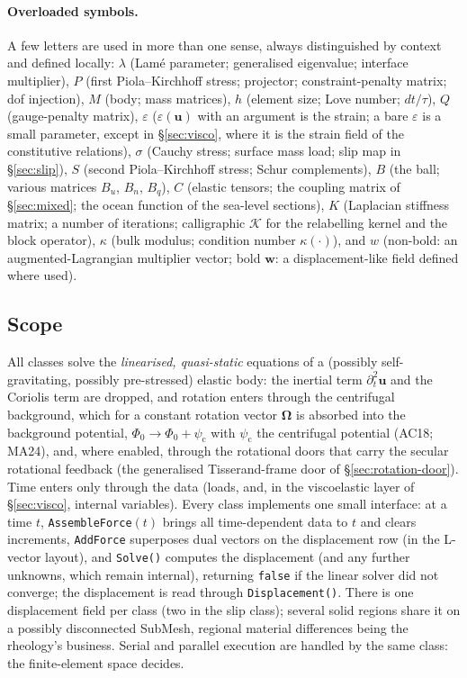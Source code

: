 \documentclass[11pt]{article}
\numberwithin{equation}{section}
\theoremstyle{remark}
\newcommand{\eps}{\varepsilon}
\newcommand{\vu}{\mathbf{u}}
\newcommand{\vw}{\mathbf{w}}
\newcommand{\code}[1]{\texttt{#1}}
\begin{document}
\paragraph{Overloaded symbols.} A few letters are used in more than one
sense, always distinguished by context and defined locally: $\lambda$
(Lam\'e parameter; generalised eigenvalue; interface multiplier), $P$
(first Piola--Kirchhoff stress; projector; constraint-penalty matrix;
dof injection), $M$ (body; mass matrices), $h$ (element size; Love number;
$dt/\tau$), $Q$ (gauge-penalty matrix), $\eps$ ($\eps(\vu)$ with an
argument is the strain; a bare $\eps$ is a small parameter, except in
\S\ref{sec:visco}, where it is the strain field of the constitutive
relations), $\sigma$ (Cauchy
stress; surface mass load; slip map in \S\ref{sec:slip}), $S$ (second
Piola--Kirchhoff stress; Schur complements), $B$ (the ball; various
matrices $B_u$, $B_n$, $B_q$), $C$ (elastic tensors; the coupling matrix of
\S\ref{sec:mixed}; the ocean function of the sea-level sections), $K$
(Laplacian stiffness matrix; a number of
iterations; calligraphic $\mathcal{K}$ for the relabelling kernel and the
block operator), $\kappa$ (bulk modulus; condition number $\kappa(\cdot)$),
and $w$
(non-bold: an augmented-Lagrangian multiplier vector; bold $\vw$: a
displacement-like field defined where used).

\subsection{Scope}

All classes solve the \emph{linearised, quasi-static} equations of a
(possibly self-gravitating, possibly pre-stressed) elastic body: the
inertial term $\partial_t^2\vu$ and the Coriolis term are dropped, and
rotation enters through the centrifugal background, which for a
constant rotation vector $\bm{\Omega}$ is absorbed into the background
potential, $\Phi_0 \to \Phi_0 + \psi_{\mathrm{c}}$ with
$\psi_{\mathrm{c}}$ the centrifugal potential (AC18; MA24), and, where
enabled, through the rotational doors that carry the secular rotational
feedback (the generalised Tisserand-frame door of
\S\ref{sec:rotation-door}). Time enters only through the data (loads,
and, in the viscoelastic layer of \S\ref{sec:visco}, internal variables).
Every class implements one small interface: at a time $t$,
\code{AssembleForce}$(t)$ brings all time-dependent data to $t$ and
clears increments, \code{AddForce} superposes dual vectors on the
displacement row (in the L-vector layout), and \code{Solve()} computes the
displacement (and any further unknowns, which remain internal), returning
\code{false} if the linear solver did not converge; the displacement is
read through \code{Displacement()}. There is one displacement field
per class (two in the slip class); several solid regions share it on a
possibly disconnected SubMesh, regional material differences being the
rheology's business. Serial and parallel execution are handled by the same
class: the finite-element space decides.
\end{document}
